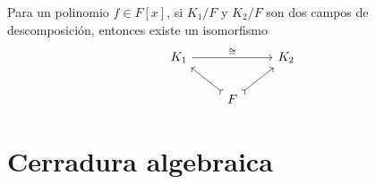 \begin{corolario}
  Para un polinomio $f\in F [x]$, si $K_1/F$ y $K_2/F$ son dos campos
  de descomposición, entonces existe un isomorfismo
  \[ \begin{tikzcd}
    K_1 \ar{rr}{\cong} && K_2 \\
    & F\ar[>->]{ul}\ar[>->]{ur}
  \end{tikzcd} \]
\end{corolario}


\section{Cerradura algebraica}

